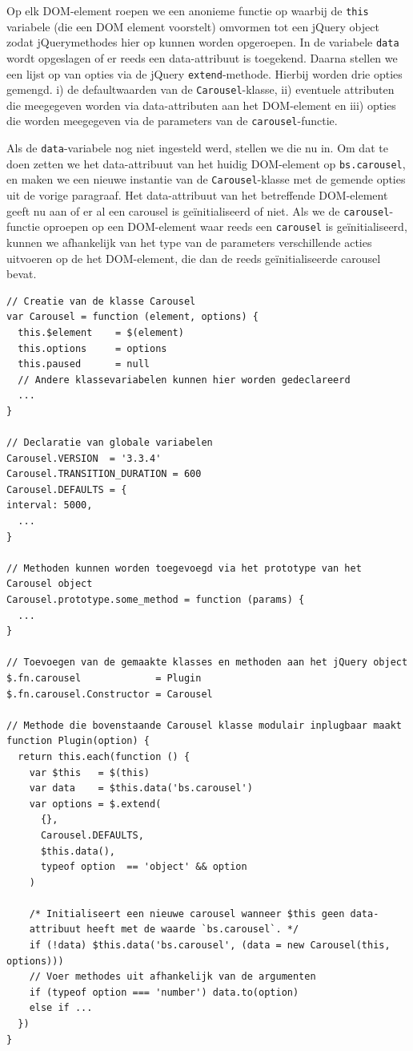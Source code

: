 Op elk DOM-element roepen we een anonieme functie op waarbij de \texttt{this}
variabele (die een DOM element voorstelt) omvormen tot een jQuery object zodat
jQuerymethodes hier op kunnen worden opgeroepen. In de variabele \texttt{data}
wordt opgeslagen of er reeds een data-attribuut is toegekend. Daarna stellen we
een lijst op van opties via de jQuery \texttt{extend}-methode. Hierbij worden
drie opties gemengd. i) de defaultwaarden van de \texttt{Carousel}-klasse, ii)
eventuele attributen die meegegeven worden via data-attributen aan het
DOM-element en iii) opties die worden meegegeven via de parameters van de
\texttt{carousel}-functie.

Als de \texttt{data}-variabele nog niet ingesteld werd, stellen we die nu in. 
Om dat
te doen zetten we het data-attribuut van het huidig DOM-element op
\texttt{bs.carousel}, en maken we een nieuwe instantie van de
\texttt{Carousel}-klasse met de gemende opties uit de vorige paragraaf. Het
data-attribuut van het betreffende DOM-element geeft nu aan of er al een
carousel is geïnitialiseerd of niet. Als we de \texttt{carousel}-functie
oproepen op een DOM-element waar reeds een \texttt{carousel} is geïnitialiseerd,
kunnen we afhankelijk van het type van de parameters verschillende acties
uitvoeren op de het DOM-element, die dan de reeds geïnitialiseerde carousel
bevat.

\begin{lstlisting}[caption=Ingekorte Bootstrap code van de 
\texttt{Carousel}-plugin, 
label=lst:bootstrapcarousel]
// Creatie van de klasse Carousel
var Carousel = function (element, options) {
  this.$element    = $(element)
  this.options     = options
  this.paused      = null
  // Andere klassevariabelen kunnen hier worden gedeclareerd
  ...
}

// Declaratie van globale variabelen
Carousel.VERSION  = '3.3.4'
Carousel.TRANSITION_DURATION = 600
Carousel.DEFAULTS = {
interval: 5000,
  ...
}

// Methoden kunnen worden toegevoegd via het prototype van het Carousel object
Carousel.prototype.some_method = function (params) {
  ...
}

// Toevoegen van de gemaakte klasses en methoden aan het jQuery object
$.fn.carousel             = Plugin
$.fn.carousel.Constructor = Carousel

// Methode die bovenstaande Carousel klasse modulair inplugbaar maakt
function Plugin(option) {
  return this.each(function () {
    var $this   = $(this)
    var data    = $this.data('bs.carousel')
    var options = $.extend(
      {}, 
      Carousel.DEFAULTS, 
      $this.data(), 
      typeof option  == 'object' && option
    )

    /* Initialiseert een nieuwe carousel wanneer $this geen data-
    attribuut heeft met de waarde `bs.carousel`. */
    if (!data) $this.data('bs.carousel', (data = new Carousel(this, options)))
    // Voer methodes uit afhankelijk van de argumenten
    if (typeof option === 'number') data.to(option)
    else if ...
  })
}
\end{lstlisting}

